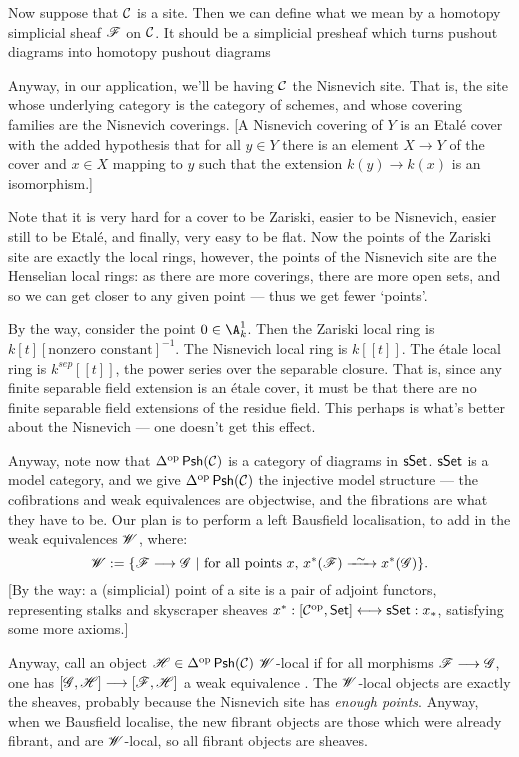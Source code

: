 \documentclass[11pt]{article}
\begin{document}
Now suppose that $\mathcal{C}$ is a site. Then we can define what we mean by a homotopy simplicial sheaf $\mathscr{F}$ on $\mathcal{C}$. It should be a simplicial presheaf which turns pushout diagrams into homotopy pushout diagrams 

Anyway, in our application, we'll be having $\mathcal{C}$ the Nisnevich site. That is, the site whose underlying category is the category of schemes, and whose covering families are the Nisnevich coverings. [A Nisnevich covering of $Y$ is an Etal\'e cover with the added hypothesis that for all $y\in Y$ there is an element $X\to Y$ of the cover and $x\in X$ mapping to $y$ such that the extension $k(y)\to k(x)$ is an isomorphism.]

Note that it is very hard for a cover to be Zariski, easier to be Nisnevich, easier still to be Etal\'e, and finally, very easy to be flat. Now the points of the Zariski site are exactly the local rings, however, the points of the Nisnevich site are the Henselian local rings: as there are more coverings, there are more open sets, and so we can get closer to any given point --- thus we get fewer `points'.

By the way, consider the point $0\in\A^1_k$. Then the Zariski local ring is $k[t][\text{nonzero constant}]^{-1}$. The Nisnevich local ring is $k[[t]]$. The \'etale local ring is $k^{sep}[[t]]$, the power series over the separable closure. That is, since any finite separable field extension is an \'etale cover, it must be that there are no finite separable field extensions of the residue field. This perhaps is what's better about the Nisnevich --- one doesn't get this effect.

Anyway, note now that $\Delta^{\textup{op}}\operatorname{{\mathsf{Psh}}}(\mathcal{C})$ is a category of diagrams in $\operatorname{{\mathsf{sSet}}}$. $\operatorname{{\mathsf{sSet}}}$ is a model category, and we give $\Delta^{\textup{op}}\operatorname{{\mathsf{Psh}}}(\mathcal{C})$ the injective model structure --- the cofibrations and weak equivalences are objectwise, and the fibrations are what they have to be. Our plan is to perform a left Bausfield localisation, to add in the weak equivalences $\mathscr{W}$, where:
\[\scrW:=\{\scrF\to\scrG\ |\ \text{for all points $x$, $x^*(\scrF)\weakequiv x^*(\scrG)$}\}.\]
[By the way: a (simplicial) point of a site is a pair of adjoint functors, representing stalks and skyscraper sheaves $x^*:[\mathcal{C}^{\textup{op}},\operatorname{{\mathsf{Set}}}]\longleftrightarrow\operatorname{{\mathsf{sSet}}}:x_*$, satisfying some more axioms.]

Anyway, call an object $\mathscr{H}\in\Delta^{\textup{op}}\operatorname{{\mathsf{Psh}}}(\mathcal{C})$ $\mathscr{W}$-local if for all morphisms $\mathscr{F}\longrightarrow\mathscr{G}$, one has $[\mathscr{G},\mathscr{H}]\longrightarrow[\mathscr{F},\mathscr{H}]$ a weak equivalence . The $\mathscr{W}$-local objects are exactly the sheaves, probably because the Nisnevich site has \emph{enough points}. Anyway, when we Bausfield localise, the new fibrant objects are those which were already fibrant, and are $\mathscr{W}$-local, so all fibrant objects are sheaves.
\end{document}
